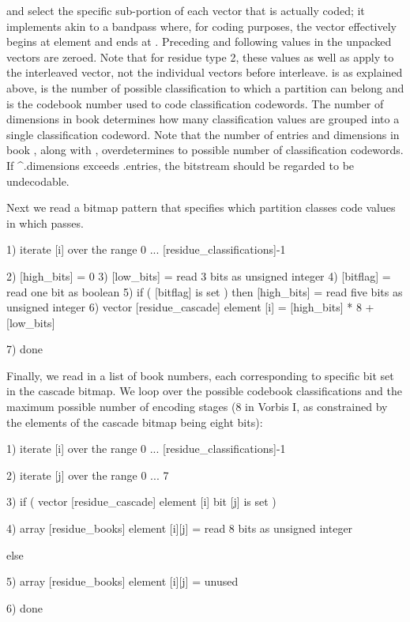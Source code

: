  and
 select the specific sub-portion of
each vector that is actually coded; it implements akin to a bandpass
where, for coding purposes, the vector effectively begins at element
 and ends at
.  Preceding and following values in
the unpacked vectors are zeroed.  Note that for residue type 2, these
values as well as apply to
the interleaved vector, not the individual vectors before interleave.
 is as explained above,
 is the number of possible
classification to which a partition can belong and
 is the codebook number used to
code classification codewords.  The number of dimensions in book
 determines how many
classification values are grouped into a single classification
codeword.  Note that the number of entries and dimensions in book
, along with
, overdetermines to
possible number of classification codewords.  
If \^{}.dimensions
exceeds .entries, the
bitstream should be regarded to be undecodable.

Next we read a bitmap pattern that specifies which partition classes
code values in which passes.

\begin{programlisting}
  1) iterate [i] over the range 0 ... [residue_classifications]-1 {

       2) [high_bits] = 0
       3) [low_bits] = read 3 bits as unsigned integer
       4) [bitflag] = read one bit as boolean
       5) if ( [bitflag] is set ) then [high_bits] = read five bits as unsigned integer
       6) vector [residue_cascade] element [i] = [high_bits] * 8 + [low_bits]
     }
  7) done
\end{programlisting}

Finally, we read in a list of book numbers, each corresponding to
specific bit set in the cascade bitmap.  We loop over the possible
codebook classifications and the maximum possible number of encoding
stages (8 in Vorbis I, as constrained by the elements of the cascade
bitmap being eight bits):

\begin{programlisting}
  1) iterate [i] over the range 0 ... [residue_classifications]-1 {

       2) iterate [j] over the range 0 ... 7 {

            3) if ( vector [residue_cascade] element [i] bit [j] is set ) {

                 4) array [residue_books] element [i][j] = read 8 bits as unsigned integer

               } else {

                 5) array [residue_books] element [i][j] = unused

               }
          }
      }

  6) done
\end{programlisting}

